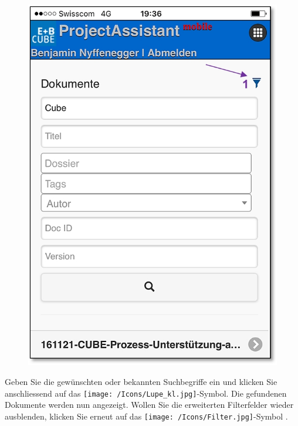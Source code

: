 \begin{figure}   %
  \vspace{-35pt}      %
  \begin{center}
    \includegraphics[width=1\linewidth]{../chapters/11_Dokumentenablage/pictures/11-mob05_Filterverwenden.jpg}
  \end{center}
  \vspace{-20pt}
  \vspace{-10pt}
\end{figure}

Geben Sie die gewünschten oder bekannten Suchbegriffe ein und klicken Sie anschliessend auf das \texttt{[image: /Icons/Lupe\_kl.jpg]}-Symbol. Die gefundenen Dokumente werden nun angezeigt. Wollen Sie die erweiterten Filterfelder wieder ausblenden, klicken Sie erneut auf das \texttt{[image: /Icons/Filter.jpg]}-Symbol .

